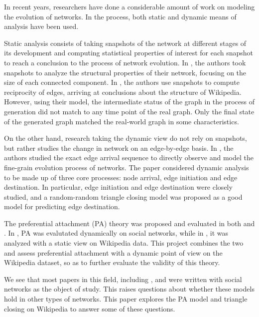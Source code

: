 \documentclass[10pt,twocolumn]{article}
\begin{document}
In recent years, researchers have done a considerable amount of work on modeling the evolution of networks. In the process, both static and dynamic means of analysis have been used.

Static analysis consists of taking snapshots of the network at different stages of its development and computing statistical properties of interest for each snapshot to reach a conclusion to the process of network evolution. In \cite{kumar2010structure}, the authors took snapshots to analyze the structural properties of their network, focusing on the size of each connected component. In \cite{zlatic2011model}, the authors use snapshots to compute reciprocity of edges, arriving at conclusions about the structure of Wikipedia. However, using their model, the intermediate status of the graph in the process of generation did not match to any time point of the real graph. Only the final state of the generated graph matched the real-world graph in some characteristics.

On the other hand, research taking the dynamic view do not rely on snapshots, but rather studies the change in network on an edge-by-edge basis. In \cite{leskovec2008microscopic}, the authors studied the exact edge arrival sequence to directly observe and model the fine-grain evolution process of networks. The paper considered dynamic analysis to be made up of three core processes: node arrival, edge initiation and edge destination. In particular, edge initiation and edge destination were closely studied, and a random-random triangle closing model was proposed as a good model for predicting edge destination.

The preferential attachment (PA) theory was proposed and evaluated in both \cite{leskovec2008microscopic} and \cite{zlatic2011model}. In \cite{leskovec2008microscopic}, PA was evalutated dynamically on social networks, while in \cite{zlatic2011model}, it was analyzed with a static view on Wikipedia data. This project combines the two and assess preferential attachment with a dynamic point of view on the Wikipedia dataset, so as to further evaluate the validity of this theory.

We see that most papers in this field, including \cite{leskovec2008microscopic}, \cite{kossinets2006empirical} and \cite{kumar2010structure} were written with social networks as the object of study. This raises questions about whether these models hold in other types of networks. This paper explores the PA model and triangle closing on Wikipedia to answer some of these questions.
\end{document}
